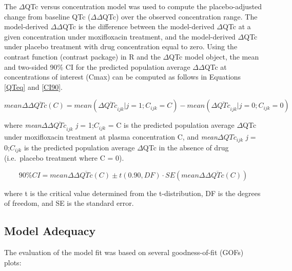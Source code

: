 \documentclass[
]{article}
\begin{document}
The \(\Delta\)QTc versus concentration model was used to compute the
placebo-adjusted change from baseline QTc (\(\Delta\Delta\)QTc) over the
observed concentration range. The model-derived \(\Delta\Delta\)QTc is
the difference between the model-derived \(\Delta\)QTc at a given
concentration under moxifloxacin treatment, and the model-derived
\(\Delta\)QTc under placebo treatment with drug concentration equal to
zero. Using the contrast function (contrast package)
\citep{bib:contrast} in R and the \(\Delta\)QTc model object, the mean
and two-sided 90\% CI for the predicted population average
\(\Delta\Delta\)QTc at concentrations of interest (Cmax) can be computed
as follows in Equations \ref{QTeq} and \ref{CI90}.

\begin{equation} \label{QTeq}
mean \Delta \Delta \overline{QTc}(C) = mean (\Delta \overline{QTc}_{ijk}|j= 1;C_{ijk} =C)-mean (\Delta \overline{QTc}_{ijk}|j = 0;C_{ijk} = 0) 
\end{equation}

where \emph{mean}\(\Delta\Delta\overline{QTc}_{ijk}\)\textbar{} \emph{j}
= 1;\(C_{ijk}\) = C is the predicted population average \(\Delta\)QTc
under moxifloxacin treatment at plasma concentration C, and
\emph{mean}\(\Delta QTc_{ijk}\)\textbar{} \emph{j} = 0;\(C_{ijk}\) is
the predicted population average \(\Delta\)QTc in the absence of drug
(i.e.~placebo treatment where C = 0).

\begin{equation} \label{CI90}
90\% CI = mean \Delta \Delta \overline{QTc}(C) \pm t(0.90, DF) \cdot SE (mean \Delta \Delta \overline{QTc}(C)) 
\end{equation}

where t is the critical value determined from the t-distribution, DF is
the degrees of freedom, and SE is the standard error.

\hypertarget{model-adequacy}{%
\subsection{Model Adequacy}\label{model-adequacy}}

The evaluation of the model fit was based on several goodness-of-fit
(GOFs) plots:
\end{document}
